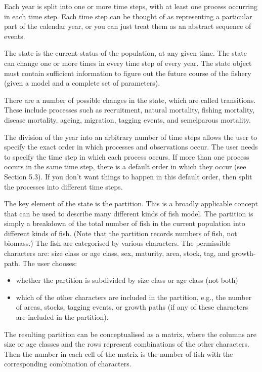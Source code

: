 Each year is split into one or more time steps, with at least one process occurring in each time step. Each time step can be thought of as representing a particular part of the calendar year, or you can just treat them as an abstract sequence of events.

The state is the current status of the population, at any given time. The state can change one or more times in every time step of every year. The state object must contain sufficient information to figure out the future course of the fishery (given a model and a complete set of parameters).

There are a number of possible changes in the state, which are called transitions. These include processes such as recruitment, natural mortality, fishing mortality, disease mortality, ageing, migration, tagging events, and semelparous mortality.

The division of the year into an arbitrary number of time steps allows the user to specify the exact order in which processes and observations occur. The user needs to specify the time step in which each process occurs. If more than one process occurs in the same time step, there is a default order in which they occur (see Section 5.3). If you don’t want things to happen in this default order, then split the processes into different time steps.

The key element of the state is the partition. This is a broadly applicable concept that can be used to describe many different kinds of fish model. The partition is simply a breakdown of the total number of fish in the current population into different kinds of fish. (Note that the partition records numbers of fish, not biomass.) The fish are categorised by various characters. The permissible characters are: size class or age class, sex, maturity, area, stock, tag, and growth-path. The user chooses: 

\begin{itemize}
\item	whether the partition is subdivided by size class or age class (not both)
\item	which of the other characters are included in the partition, e.g., the number of areas, stocks, tagging events, or growth paths (if any of these characters are included in the partition).
\end{itemize}

The resulting partition can be conceptualised as a matrix, where the columns are size or age classes and the rows represent combinations of the other characters. Then the number in each cell of the matrix is the number of fish with the corresponding combination of characters. 

